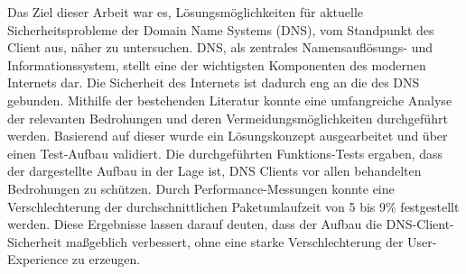 
Das Ziel dieser Arbeit war es, Lösungsmöglichkeiten für aktuelle Sicherheitsprobleme der Domain Name Systems (DNS), vom Standpunkt des Client aus, näher zu untersuchen. DNS, als zentrales Namensauflösungs- und Informationssystem, stellt eine der wichtigsten Komponenten des modernen Internets dar. Die Sicherheit des Internets ist dadurch eng an die des DNS gebunden. Mithilfe der bestehenden Literatur konnte eine umfangreiche Analyse der relevanten Bedrohungen und deren Vermeidungsmöglichkeiten durchgeführt werden. Basierend auf dieser wurde ein Lösungskonzept ausgearbeitet und über einen Test-Aufbau validiert. Die durchgeführten Funktions-Tests ergaben, dass der dargestellte Aufbau in der Lage ist, DNS Clients vor allen behandelten Bedrohungen zu schützen. Durch Performance-Messungen konnte eine Verschlechterung der durchschnittlichen Paketumlaufzeit von 5 bis 9\% festgestellt werden. Diese Ergebnisse lassen darauf deuten, dass der Aufbau die DNS-Client-Sicherheit maßgeblich verbessert, ohne eine starke Verschlechterung der User-Experience zu erzeugen.
